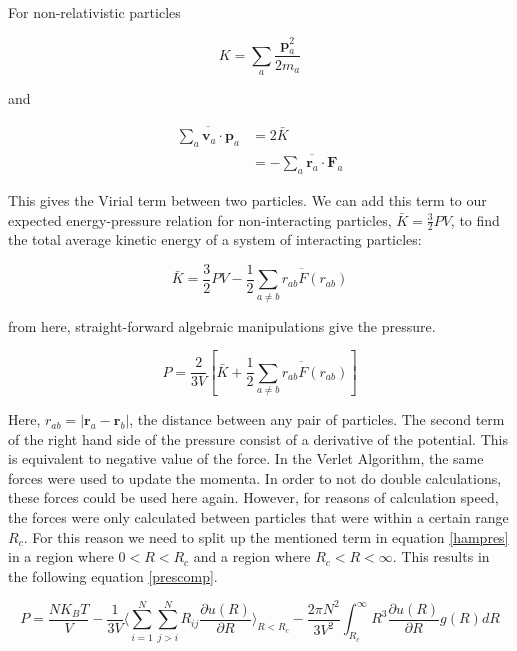 \documentclass{article}
\begin{document}
\begin{multicols}{2}
\noindent  For non-relativistic particles 

\begin{equation}
K = \sum \limits _a \frac{\textbf{p}_{a}^2}{2m_a}
\end{equation}

\noindent and 

\begin{equation}
\begin{split}
\overline{\sum \limits _a \textbf{v}_a \cdot \textbf{p}_a} & = 2\bar{K} \\
& = - \overline{\sum \limits _a \textbf{r}_a \cdot \textbf{F}_a}
\end{split}
\end{equation}

\noindent This gives the Virial term between two particles.  We can add this term to our expected energy-pressure relation for non-interacting particles, $\bar{K}=\frac{3}{2}PV$, to find the total average kinetic energy of a system of interacting particles:  

\begin{equation}
\bar{K} = \frac{3}{2} PV - \frac{1}{2} \overline{\sum \limits _{a \ne b} r_{ab} F(r_{ab})}
\end{equation}

\noindent from here, straight-forward algebraic manipulations give the pressure.

\begin{equation}
P = \frac{2}{3V} \left [ \bar{K} + \frac{1}{2} \overline{\sum \limits _{a\ne b} r_{ab} F(r_{ab})} \right ]
\label{hampres}
\end{equation}

\noindent Here, $r_{ab} = |\textbf{r}_a - \textbf{r}_b|$, the distance between any pair of particles.
The second term of the right hand side of the pressure consist of a derivative of the potential. This is equivalent to negative value of the force. In the Verlet Algorithm, the same forces were used to update the momenta. In order to not do double calculations, these forces could be used here again. However, for reasons of calculation speed, the forces were only calculated between particles that were within a certain range $R_c$. For this reason we need to split up the mentioned term in equation \ref{hampres} in a region where $0 < R < R_c $ and a region where $ R_c < R < \infty $. This results in the following equation \ref{prescomp}.

\begin{equation}
P = \frac{N K_B T}{V} - \frac{1}{3 V} \langle \sum\limits_{i=1}^N \sum\limits_{j>i}^N R_{ij} \frac{\partial u(R)}{\partial R}\rangle_{R < R_c} - \frac{2 \pi N^2}{3 V^2} \int_{R_c}^\infty R^3 \frac{\partial u(R)}{\partial R} g(R) dR
\label{prescomp}
\end{equation}


\end{multicols}
\end{document}
